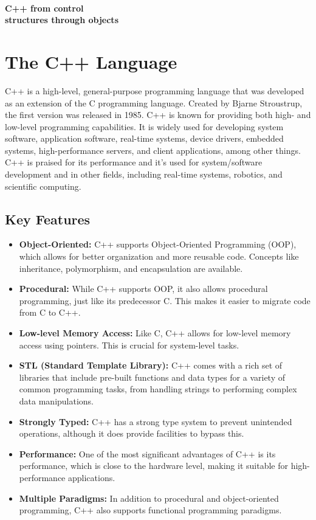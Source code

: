 \documentclass{report}
\begin{document}
    \pagebreak \bigbreak \noindent 
    \vspace{2.2in} \\
    \begin{Huge}
        \textbf{C++ from control \\ structures through objects}
    \end{Huge}
    \bigbreak \noindent 
    \sepline
    \bigbreak \noindent 
    \section{\LARGE The C++ Language}
    \bigbreak \noindent 
    C++ is a high-level, general-purpose programming language that was developed as an extension of the C programming language. Created by Bjarne Stroustrup, the first version was released in 1985. C++ is known for providing both high- and low-level programming capabilities. It is widely used for developing system software, application software, real-time systems, device drivers, embedded systems, high-performance servers, and client applications, among other things. C++ is praised for its performance and it's used for system/software development and in other fields, including real-time systems, robotics, and scientific computing.
    \bigbreak \noindent 
    \subsection{Key Features}
    \bigbreak \noindent 
    \begin{itemize}
        \item \textbf{Object-Oriented:} C++ supports Object-Oriented Programming (OOP), which allows for better organization and more reusable code. Concepts like inheritance, polymorphism, and encapsulation are available.
        \item \textbf{Procedural:} While C++ supports OOP, it also allows procedural programming, just like its predecessor C. This makes it easier to migrate code from C to C++.
        \item \textbf{Low-level Memory Access:} Like C, C++ allows for low-level memory access using pointers. This is crucial for system-level tasks.
        \item \textbf{STL (Standard Template Library):} C++ comes with a rich set of libraries that include pre-built functions and data types for a variety of common programming tasks, from handling strings to performing complex data manipulations.
        \item \textbf{Strongly Typed:} C++ has a strong type system to prevent unintended operations, although it does provide facilities to bypass this.
        \item \textbf{Performance:} One of the most significant advantages of C++ is its performance, which is close to the hardware level, making it suitable for high-performance applications.
        \item \textbf{Multiple Paradigms:} In addition to procedural and object-oriented programming, C++ also supports functional programming paradigms.
    \end{itemize}
\end{document}
